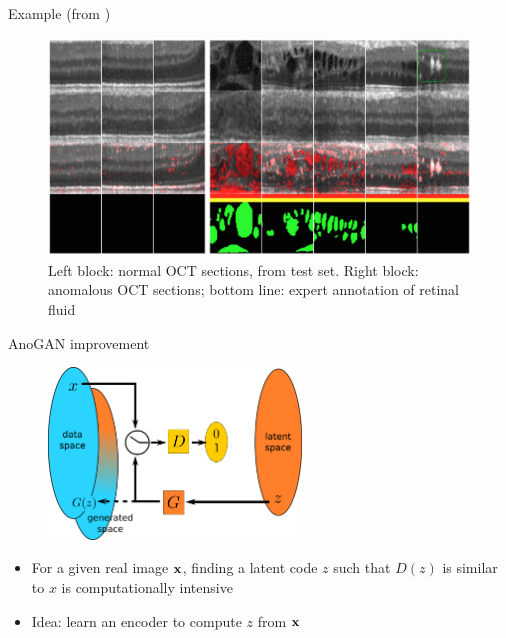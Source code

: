 \documentclass[xcolor=pdftex,dvipsnames,table,mathserif]{beamer}
\begin{document}
\begin{frame}{Example (from \cite{schlegl_unsupervised_2017})}


  \begin{figure}[ht]
    \centering
    \includegraphics[width=\textwidth]{res_oct}
    \caption{Left block: normal OCT sections, from test set. Right block: anomalous OCT sections; bottom line: expert annotation of retinal fluid}
  \end{figure}

\end{frame}


\begin{frame}{AnoGAN improvement}

\begin{figure}[ht]
  \centering
  \includegraphics[width=0.6\textwidth]{gan2}
\end{figure}

\begin{itemize}
\item For a given real image $\mathbf{x}$, finding a latent code $z$ such that $D(z)$ is similar to $x$ is computationally intensive
\item Idea: learn an encoder to compute $z$ from $\mathbf{x}$
\end{itemize}

\end{frame}
\end{document}

